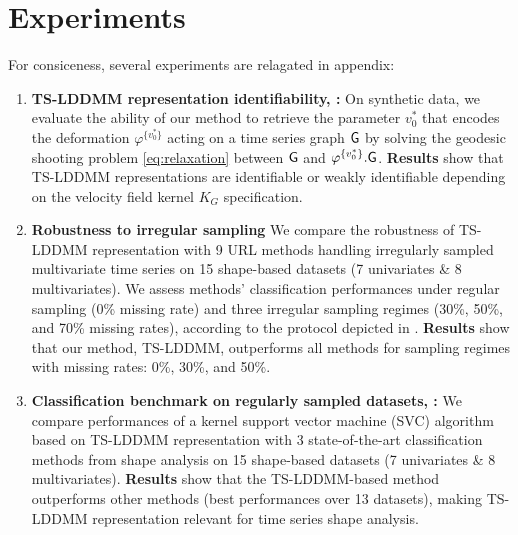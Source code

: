 \section{Experiments}
\vspace{-1ex}
\label{section:experiments}

For consiceness, several experiments are relagated in appendix: 

\begin{enumerate}
    \item \textbf{TS-LDDMM representation identifiability, :} On synthetic data, we evaluate the ability of our method to retrieve the parameter $v_0^*$ that encodes the deformation $\varphi^{\{v_0^*\}}$ acting on a time series graph $\mathsf{G}$ by solving the geodesic shooting problem \eqref{eq:relaxation} between $\mathsf{G}$ and $\varphi^{\{v_0^*\}}.\mathsf{G}$.
     \textbf{Results} show that TS-LDDMM representations are identifiable or weakly identifiable depending on the velocity field kernel $K_G$ specification.
  
    \item \textbf{Robustness to irregular sampling} We compare the robustness of TS-LDDMM representation with 9 URL methods handling irregularly sampled multivariate time series on 15 shape-based datasets (7 univariates \& 8 multivariates).
     We assess methods' classification performances under regular sampling (0\% missing rate) and three irregular sampling regimes (30\%, 50\%, and 70\% missing rates), according to the protocol depicted in \cite{kidger2020neural}.
      \textbf{Results} show that our method, TS-LDDMM, outperforms all methods for sampling regimes with missing rates: 0\%, 30\%, and 50\%.
    
    \item \textbf{Classification benchmark on regularly sampled datasets, :} We compare performances of a kernel support vector machine (SVC) algorithm based on TS-LDDMM representation with 3 state-of-the-art classification methods from shape analysis on 15 shape-based datasets (7 univariates \& 8 multivariates). \textbf{Results} show that the TS-LDDMM-based method outperforms other methods (best performances over 13 datasets), making TS-LDDMM representation relevant for time series shape analysis.
\end{enumerate}

